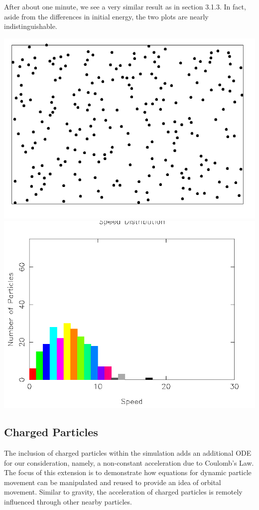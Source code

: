 \documentclass{article}
\begin{document}
After about one minute, we see a very similar result as in section 3.1.3. In fact, aside from the differences in initial energy,
the two plots are nearly indistinguishable.
\\
\begin{center}
    \includegraphics[scale=0.5]{uncharged_pool_2}
    \includegraphics[scale=0.5]{uncharged_pool_dist_2}
\end{center}

\subsection{Charged Particles}
The inclusion of charged particles within the simulation adds an additional ODE for our consideration,
namely, a non-constant acceleration due to Coulomb's Law.
The focus of this extension is to demonstrate how equations for dynamic particle movement
can be manipulated and reused to provide an idea of orbital movement.
Similar to gravity, the acceleration of charged particles is remotely influenced through other nearby particles.
\end{document}
